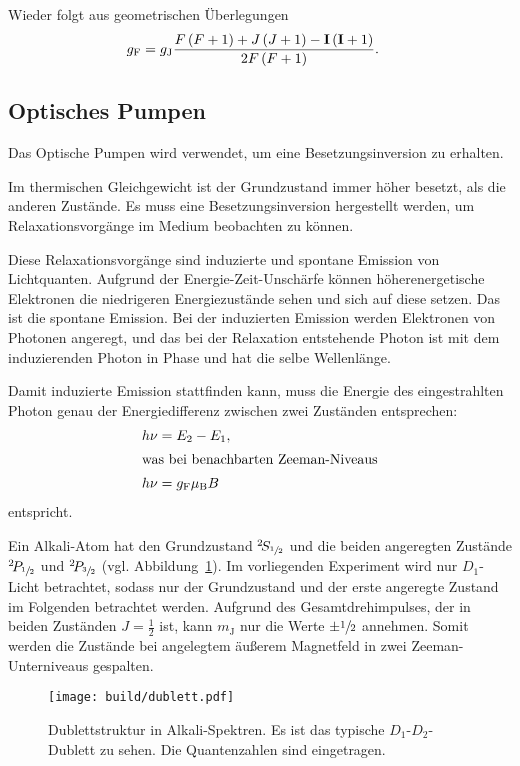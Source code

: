 Wieder folgt aus geometrischen Überlegungen
\begin{align}
  \label{eq:g_f}
  g_\text{F} &= g_\text{J} \frac{%
    F \left(F + 1\right) + J\left(J + 1\right) - \mathbf{I} \left(\mathbf{I} + 1\right)
  }{2 F \left(F + 1\right)}.
\end{align}


\subsection{Optisches Pumpen}%
\label{sub:optisches_pumpen}

Das Optische Pumpen wird verwendet, um eine Besetzungsinversion zu erhalten.

Im thermischen Gleichgewicht ist der Grundzustand immer höher besetzt, als die
anderen Zustände.
Es muss eine Besetzungsinversion hergestellt werden, um Relaxationsvorgänge im
Medium beobachten zu können.

Diese Relaxationsvorgänge sind induzierte und spontane Emission von
Lichtquanten.
Aufgrund der Energie-Zeit-Unschärfe können höherenergetische Elektronen die
niedrigeren Energiezustände sehen und sich auf diese setzen.
Das ist die spontane Emission.
Bei der induzierten Emission werden Elektronen von Photonen angeregt,
und das bei der Relaxation entstehende Photon ist mit dem induzierenden Photon
in Phase und hat die selbe Wellenlänge.

Damit induzierte Emission stattfinden kann, muss die Energie des eingestrahlten Photon
genau der Energiedifferenz zwischen zwei Zuständen entsprechen:
\begin{align}
  h \nu &= E_2 - E_1, \\
  \intertext{was bei benachbarten Zeeman-Niveaus}
  \label{eq:zeeman_energie}
  h \nu &= g_\text{F} \mu_\text{B} B
\end{align}
entspricht.

Ein Alkali-Atom hat den Grundzustand
${}^2\!S_{\sfrac{1}{2}}$
und die beiden angeregten Zustände
${}^2\!P_{\sfrac{1}{2}}$
und
${}^2\!P_{\sfrac{3}{2}}$
(vgl. Abbildung~\ref{fig:dublett}).
Im vorliegenden Experiment wird nur $D_1$-Licht betrachtet,
sodass nur der Grundzustand und der erste angeregte Zustand im Folgenden
betrachtet werden.
Aufgrund des Gesamtdrehimpulses, der in beiden Zuständen $J = \frac{1}{2}$ ist,
kann $m_\text{J}$ nur die Werte $\pm\sfrac{1}{2}$ annehmen.
Somit werden die Zustände bei angelegtem äußerem Magnetfeld in zwei
Zeeman-Unterniveaus gespalten.

\begin{figure}[ht]
  \centering
  \texttt{[image: build/dublett.pdf]}
  \caption{%
    Dublettstruktur in Alkali-Spektren.\cite{anleitung}
    Es ist das typische $D_1$-$D_2$-Dublett zu sehen.
    Die Quantenzahlen sind eingetragen.
  }%
  \label{fig:dublett}
\end{figure}

